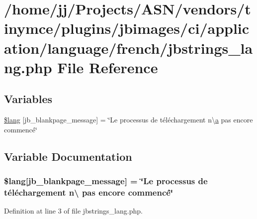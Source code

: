 \hypertarget{french_2jbstrings__lang_8php}{}\section{/home/jj/\+Projects/\+A\+S\+N/vendors/tinymce/plugins/jbimages/ci/application/language/french/jbstrings\+\_\+lang.php File Reference}
\label{french_2jbstrings__lang_8php}
\subsection*{Variables}
\begin{DoxyCompactItemize}
\item 
\hyperlink{french_2jbstrings__lang_8php_a940d854d6735a1c346b18d7692b81d72}{\$lang} \mbox{[}\textquotesingle{}jb\+\_\+blankpage\+\_\+message\textquotesingle{}\mbox{]} = \char`\"{}Le processus de téléchargement n\textbackslash{}\textquotesingle{}\hyperlink{_chart_8min_8js_aef3b685c08bc6c76c8e729bd0e93901d}{a} pas encore commencé\char`\"{}
\end{DoxyCompactItemize}


\subsection{Variable Documentation}
\subsubsection[{\texorpdfstring{\$lang}{$lang}}]{\setlength{\rightskip}{0pt plus 5cm}\$lang\mbox{[}\textquotesingle{}jb\+\_\+blankpage\+\_\+message\textquotesingle{}\mbox{]} = \char`\"{}Le processus de téléchargement n\textbackslash{} pas encore commencé\char`\"{}}\hypertarget{french_2jbstrings__lang_8php_a940d854d6735a1c346b18d7692b81d72}{}\label{french_2jbstrings__lang_8php_a940d854d6735a1c346b18d7692b81d72}


Definition at line 3 of file jbstrings\+\_\+lang.\+php.

